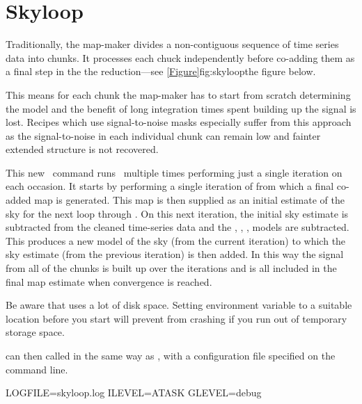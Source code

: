 \documentclass[11pt,oneside,chapters]{starlink}
\begin{document}
\section{Skyloop}
\label{sec:skyloop}


Traditionally, the map-maker divides a non-contiguous sequence of time
series data into chunks. It processes each chuck independently
before co-adding them as a final step in the the reduction---see
\cref{Figure}{fig:skyloop}{the figure below}.

This means for each chunk the map-maker has to start from scratch
determining the  model and the benefit of long integration
times spent building up the signal is lost. Recipes which use
signal-to-noise masks especially suffer from this approach as the
signal-to-noise in each individual chunk can remain low and fainter
extended structure is not recovered.

This new \skyloop\ command runs \makemap\ multiple times
performing just a single iteration on each occasion. It starts by
performing a single iteration of  from which a final
co-added map is generated. This map is then supplied as an initial
estimate of the sky for the next loop through . On
this next iteration, the initial sky estimate is subtracted from the
cleaned time-series data and the , ,
,  models are subtracted. This produces a new
model of the sky (from the current iteration) to which the sky
estimate (from the previous iteration) is then added. In this way the
signal from all of the chunks is built up over the iterations and is
all included in the final map estimate when convergence is reached.




Be aware that  uses a lot of disk space. Setting
environment variable  to a suitable location
before you start will prevent  from crashing
if you run out of temporary storage space.
\begin{terminalv}
\end{terminalv}
 can then called in the same way as \makemap, with
 a configuration file specified on the command line.
\begin{terminalv}
LOGFILE=skyloop.log ILEVEL=ATASK GLEVEL=debug
\end{terminalv}
\end{document}
